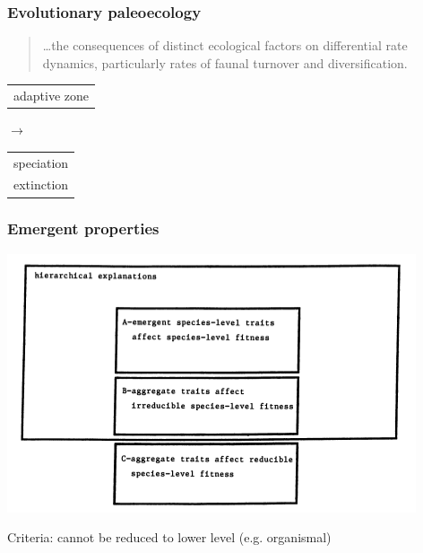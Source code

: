 \documentclass{beamer}
\begin{document}
\begin{frame}
  \frametitle{Evolutionary paleoecology}
  \begin{quotation}
    \dots the consequences of distinct ecological factors on differential rate dynamics, particularly rates of faunal turnover and diversification.

    \tiny{}
  \end{quotation}

  \vspace{1.3cm}

  \begin{center}
    \begin{tabular}{@{}l@{}}adaptive zone\end{tabular} 
    \hspace{0.75cm}
    \(\rightarrow\) 
    \hspace{1cm}
    \begin{tabular}{@{}l@{}}speciation\\extinction\end{tabular}
  \end{center}
\end{frame}

\begin{frame}
  \frametitle{Emergent properties}

  \begin{center}
    \includegraphics[height=0.4\textheight, width=\textwidth, keepaspectratio=true]{figure/grantham}

    \tiny{}

  \end{center}

  \vspace{0.5cm}

  \begin{center}
    \alert{Criteria:} cannot be reduced to lower level (e.g. organismal)
  \end{center}
\end{frame}
\end{document}
